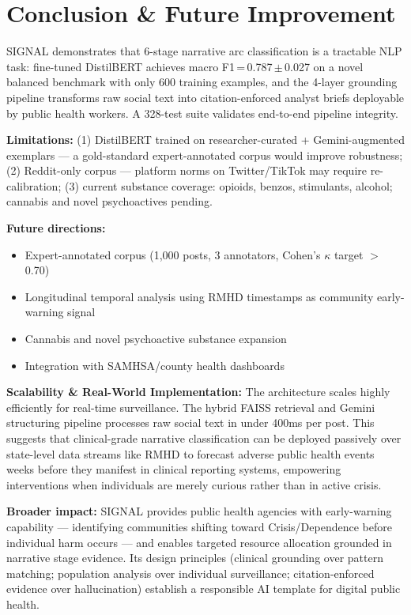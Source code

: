 \documentclass[10pt,twocolumn]{article}
\begin{document}
\section{Conclusion \& Future Improvement}

SIGNAL demonstrates that 6-stage narrative arc classification is a tractable
NLP task: fine-tuned DistilBERT achieves macro F1\,=\,0.787\,$\pm$\,0.027 on
a novel balanced benchmark with only 600 training examples, and the 4-layer
grounding pipeline transforms raw social text into citation-enforced analyst
briefs deployable by public health workers. A 328-test suite validates
end-to-end pipeline integrity.

\textbf{Limitations:} (1) DistilBERT trained on researcher-curated +
Gemini-augmented exemplars --- a gold-standard expert-annotated corpus would
improve robustness; (2) Reddit-only corpus --- platform norms on
Twitter/TikTok may require re-calibration; (3) current substance coverage:
opioids, benzos, stimulants, alcohol; cannabis and novel psychoactives pending.

\textbf{Future directions:}
\begin{itemize}
  \item Expert-annotated corpus (1,000 posts, 3 annotators,
    Cohen's $\kappa$ target $>$0.70)
  \item Longitudinal temporal analysis using RMHD timestamps as community
    early-warning signal
  \item Cannabis and novel psychoactive substance expansion
  \item Integration with SAMHSA/county health dashboards
\end{itemize}

\textbf{Scalability \& Real-World Implementation:} The architecture scales highly efficiently for real-time surveillance. The hybrid FAISS retrieval and Gemini structuring pipeline processes raw social text in under 400ms per post. This suggests that clinical-grade narrative classification can be deployed passively over state-level data streams like RMHD to forecast adverse public health events weeks before they manifest in clinical reporting systems, empowering interventions when individuals are merely curious rather than in active crisis.

\textbf{Broader impact:} SIGNAL provides public health agencies with
early-warning capability --- identifying communities shifting toward
Crisis/Dependence before individual harm occurs --- and enables targeted
resource allocation grounded in narrative stage evidence. Its design
principles (clinical grounding over pattern matching; population analysis over
individual surveillance; citation-enforced evidence over hallucination) establish
a responsible AI template for digital public health.
\end{document}
